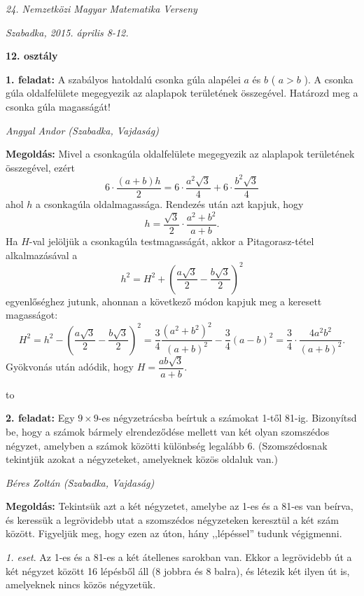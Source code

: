 \documentclass[a4paper,10pt]{article}
\newcommand{\ki}[2]{\hfill {\it #1 (#2)}\medskip}
\newcommand{\vonal}{\hbox to \hsize{\hskip2truecm\hrulefill\hskip2truecm}}
\begin{document}
\begin{center} \Large {\em 24. Nemzetközi Magyar Matematika Verseny} \end{center}
\begin{center} \large{\em Szabadka, 2015. április 8-12.} \end{center}
\smallskip
\begin{center} \large{\bf 12. osztály} \end{center}
\bigskip 

{\bf 1. feladat: } A szabályos hatoldalú csonka gúla alapélei $a$ és $b$ ( $a > b$ ). A csonka gúla
oldalfelülete megegyezik az alaplapok területének összegével. Határozd meg a csonka gúla magasságát!

\ki{Angyal Andor}{Szabadka, Vajdaság}\medskip

{\bf Megoldás: } Mivel a csonkagúla oldalfelülete megegyezik az alaplapok területének összegével, ezért
$$6\cdot\frac{(a+b)h}{2}=6\cdot\frac{a^2\sqrt 3}{4}+6\cdot\frac{b^2\sqrt 3}{4}$$
ahol $h$ a csonkagúla oldalmagassága. Rendezés után azt kapjuk, hogy
$$h=\frac{\sqrt 3}{2}\cdot\frac{a^2+b^2}{a+b}.$$
Ha $H$-val jelöljük a csonkagúla testmagasságát, akkor a Pitagorasz-tétel alkalmazásával a
$$h^2=H^2+\left(\frac{a\sqrt 3}{2}-\frac{b\sqrt 3}{2}\right)^2$$
egyenlőséghez jutunk, ahonnan a következő módon kapjuk meg a keresett magasságot:
$$H^2=h^2-\left(\frac{a\sqrt 3}{2}-\frac{b\sqrt 3}{2}\right)^2=
\frac{3}{4}\frac{(a^2+b^2)^2}{(a+b)^2}-\frac{3}{4}(a-b)^2=
\frac{3}{4}\cdot\frac{4a^2b^2}{(a+b)^2}.$$
Gyökvonás után adódik, hogy $H=\dfrac{ab\sqrt 3}{a+b}$.

\vonal

{\bf 2. feladat: } Egy $9 \times 9$-es négyzetrácsba beírtuk a számokat 1-től 81-ig. Bizonyítsd be,
hogy a számok bármely elrendeződése mellett van két olyan szomszédos négyzet,
amelyben a számok közötti különbség legalább 6. (Szomszédosnak tekintjük
azokat a négyzeteket, amelyeknek közös oldaluk van.)

\ki{Béres Zoltán}{Szabadka, Vajdaság}\medskip

{\bf Megoldás: } Tekintsük azt a két négyzetet, amelybe az 1-es és a 81-es van beírva, és keressük a legrövidebb utat a szomszédos négyzeteken keresztül a két szám között. Figyeljük meg, hogy ezen az úton, hány ,,lépéssel'' tudunk végigmenni.  

\textit{1. eset}. Az 1-es és a 81-es a két átellenes sarokban van. Ekkor a legrövidebb út a két négyzet között 16 lépésből áll (8 jobbra és 8 balra), és létezik két ilyen út is, amelyeknek nincs közös négyzetük.
\end{document}
